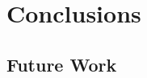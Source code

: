 \documentclass[12pt]{report}
\begin{document}
\chapter{Conclusions}
\label{chap:concl}


\section{Future Work}
\label{sec:futwork}





\nocite{travisdiss}
\nocite{travisshort}
\nocite{calgary}

\end{document}
